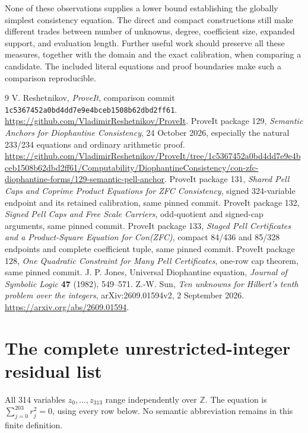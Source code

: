 \documentclass[11pt,a4paper]{article}
\theoremstyle{remark}\newtheorem{remark}[theorem]{Remark}
\newcommand{\Z}{\mathbb Z}
\newcommand{\code}[1]{\nolinkurl{#1}}
\begin{document}
None of these observations supplies a lower bound establishing the
globally simplest consistency equation. The direct and compact
constructions still make different trades between number of unknowns,
degree, coefficient size, expanded support, and evaluation length.
Further useful work should preserve all these measures, together with
the domain and the exact calibration, when comparing a candidate.
The included literal equations and proof boundaries make such a
comparison reproducible.

\begin{thebibliography}{9}
 V. Reshetnikov, \emph{ProveIt}, comparison commit
\code{1c5367452a0bd4dd7e9e4bceb1508b62dbd2ff61}.
\url{https://github.com/VladimirReshetnikov/ProveIt}.
 ProveIt package 129, \emph{Semantic Anchors for
Diophantine Consistency}, 24 October 2026, especially the natural
233/234 equations and ordinary arithmetic proof.
\url{https://github.com/VladimirReshetnikov/ProveIt/tree/1c5367452a0bd4dd7e9e4bceb1508b62dbd2ff61/Computability/DiophantineConsistency/con-zfc-diophantine-forms/129-semantic-pell-anchor}.
 ProveIt package 131, \emph{Shared Pell Caps and
Coprime Product Equations for ZFC Consistency}, signed 324-variable
endpoint and its retained calibration, same pinned commit.
 ProveIt package 132, \emph{Signed Pell Caps and
Free Scale Carriers}, odd-quotient and signed-cap arguments,
same pinned commit.
 ProveIt package 133, \emph{Staged Pell Certificates
and a Product-Square Equation for Con(ZFC)}, compact 84/436 and
85/328 endpoints and complete coefficient tuple, same pinned commit.
 ProveIt package 128, \emph{One Quadratic Constraint
for Many Pell Certificates}, one-row cap theorem, same pinned commit.
 J. P. Jones, Universal Diophantine equation,
\emph{Journal of Symbolic Logic} \textbf{47} (1982), 549--571.
 Z.-W. Sun, \emph{Ten unknowns for Hilbert's tenth
problem over the integers}, arXiv:2609.01594v2, 2 September 2026.
\url{https://arxiv.org/abs/2609.01594}.
\end{thebibliography}

\appendix
\section{The complete unrestricted-integer residual list}
\label{app:integer}
All 314 variables \(z_0,\ldots,z_{313}\) range independently over
\(\Z\). The equation is \(\sum_{j=0}^{203}r_j^2=0\), using every
row below. No semantic abbreviation remains in this finite definition.

\end{document}
